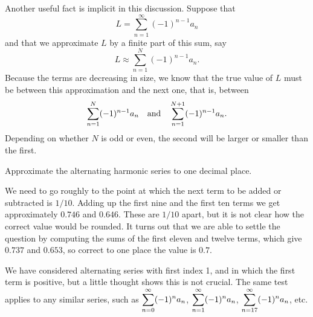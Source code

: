 Another useful fact is implicit in this discussion. Suppose that 
$$L=\sum_{n=1}^\infty (-1)^{n-1} a_n$$
and that we approximate $L$ by a finite part of this sum, say
$$L\approx \sum_{n=1}^N (-1)^{n-1} a_n.$$
Because the terms are decreasing in size, we know that the true value
of $L$ must be between this approximation and the next one, that is,
between 
$$
  \sum_{n=1}^N (-1)^{n-1} a_n \hbox{\quad and\quad}
  \sum_{n=1}^{N+1} (-1)^{n-1} a_n.
$$
Depending on whether $N$ is odd or even, the second will be larger or
smaller than the first.

\begin{example}
Approximate the alternating harmonic series to one decimal place.

We need to go roughly to the point at which the next term to be added
or subtracted is $1/10$. Adding up the first nine and the first ten
terms we get approximately $0.746$ and $0.646$. These are $1/10$
apart, but it is not clear how the correct value would be rounded. It
turns out that we are able to settle the question by computing the
sums of the first eleven and twelve terms, which give
$0.737$ and $0.653$, so correct to one place the value is $0.7$.
\end{example}

We have considered alternating series with first index 1, and in which
the first term is positive, but a little thought shows this is not
crucial. The same test applies to any similar series, such as
$\displaystyle\sum_{n=0}^\infty (-1)^n a_n$, $\displaystyle\sum_{n=1}^\infty (-1)^n a_n$, 
$\displaystyle\sum_{n=17}^\infty (-1)^n a_n$, etc.

